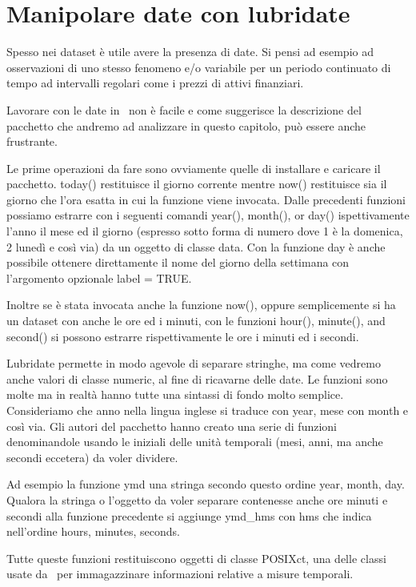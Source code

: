\chapter{Manipolare date con lubridate}
Spesso nei dataset è utile avere la presenza di date. Si pensi ad esempio ad osservazioni di uno stesso fenomeno e/o variabile per un periodo continuato di tempo ad intervalli regolari come i prezzi di attivi finanziari.

Lavorare con le date in \erre\ non è facile e come suggerisce la descrizione del pacchetto che andremo ad analizzare in questo capitolo, può essere anche frustrante.

Le prime operazioni da fare sono ovviamente quelle di installare e caricare il pacchetto.
today() restituisce il giorno corrente mentre now() restituisce sia il giorno che l'ora esatta in cui la funzione viene invocata.
Dalle precedenti funzioni possiamo estrarre con i seguenti comandi year(), month(), or day() ispettivamente l'anno il mese ed il giorno (espresso sotto forma di numero dove 1 è la domenica, 2 lunedì e così via) da un oggetto di classe data. Con la funzione day è anche possibile ottenere direttamente il nome del giorno della settimana con l'argomento opzionale label = TRUE.

Inoltre se è stata invocata anche la funzione now(), oppure semplicemente si ha un dataset con anche le ore ed i minuti, con le funzioni hour(), minute(), and second() si possono estrarre rispettivamente le ore i minuti ed i secondi.

Lubridate permette in modo agevole di separare stringhe, ma come vedremo anche valori di classe numeric, al fine di ricavarne delle date. Le funzioni sono molte ma in realtà hanno tutte una sintassi di fondo molto semplice. Consideriamo che anno nella lingua inglese si traduce con year, mese con month e così via. Gli autori del pacchetto hanno creato una serie di funzioni denominandole usando le iniziali delle unità temporali (mesi, anni, ma anche secondi eccetera) da voler dividere.

Ad esempio la funzione \textsf{ymd} una stringa secondo questo ordine year, month, day. Qualora la stringa o l'oggetto da voler separare contenesse anche ore minuti e secondi alla funzione precedente si aggiunge  \textsf{ymd\_hms} con hms che indica nell'ordine hours, minutes, seconds. 

Tutte queste funzioni restituiscono oggetti di classe POSIXct, una delle classi usate da \erre\ per immagazzinare informazioni relative a misure temporali.

